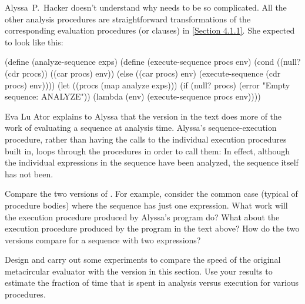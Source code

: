 \begin{exercise}
	\label{Exercise 4.23}
	Alyssa~P.~Hacker doesn’t understand why  needs to be so complicated.
	All the other analysis procedures are straightforward transformations of the corresponding evaluation procedures (or  clauses) in \cref{Section 4.1.1}.
	She expected  to look like this:
	\begin{scheme}
	  (define (analyze-sequence exps)
	    (define (execute-sequence procs env)
	      (cond ((null? (cdr procs))
	             ((car procs) env))
	            (else
	             ((car procs) env)
	             (execute-sequence (cdr procs) env))))
	    (let ((procs (map analyze exps)))
	      (if (null? procs)
	          (error "Empty sequence: ANALYZE"))
	      (lambda (env)
	        (execute-sequence procs env))))
	\end{scheme}
	Eva Lu Ator explains to Alyssa that the version in the text does more of the work of evaluating a sequence at analysis time.
	Alyssa’s sequence-execution procedure, rather than having the calls to the individual execution procedures built in, loops through the procedures in order to call them:
	In effect, although the individual expressions in the sequence have been analyzed, the sequence itself has not been.

	Compare the two versions of .
	For example, consider the common case (typical of procedure bodies) where the sequence has just one expression.
	What work will the execution procedure produced by Alyssa’s program do?
	What about the execution procedure produced by the program in the text above?
	How do the two versions compare for a sequence with two expressions?
\end{exercise}



\begin{exercise}
	\label{Exercise 4.24}
	Design and carry out some experiments to compare the speed of the original metacircular evaluator with the version in this section.
	Use your results to estimate the fraction of time that is spent in analysis versus execution for various procedures.
\end{exercise}
